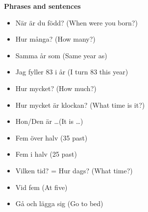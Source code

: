 
\begin{flushleft}
    \textbf{Phrases and sentences}
    \begin{itemize}
        \item När är du född? (When were you born?)
        \item Hur många? (How many?)
        \item Samma år som (Same year as)
        \item Jag fyller 83 i år (I turn 83 this year)
        \item Hur mycket? (How much?)
        \item Hur mycket är klockan? (What time is it?)
        \item Hon/Den är \ldots (It is \ldots)
        \item Fem över halv (35 past)
        \item Fem i halv (25 past)
        \item Vilken tid? = Hur dags? (What time?)
        \item Vid fem (At five)
        \item Gå och lägga sig (Go to bed)
    \end{itemize}
\end{flushleft}

